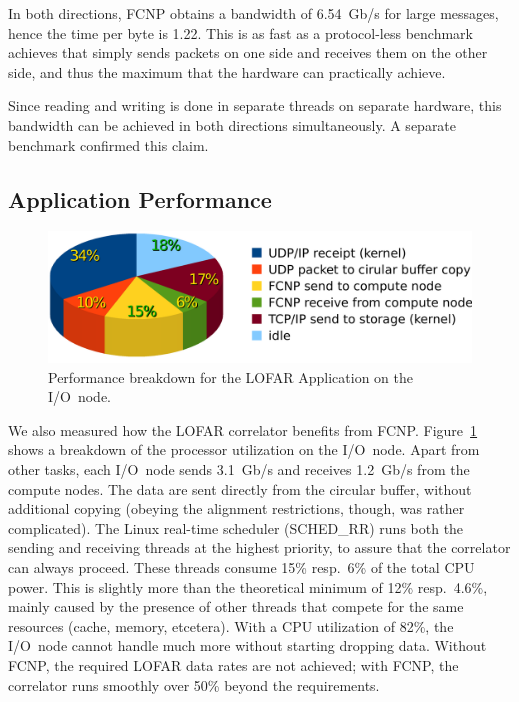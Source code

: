 \documentclass[journal]{IEEEtran}
\begin{document}
In both directions, FCNP obtains a bandwidth of 6.54~Gb/s for large messages,
hence the time per byte is 1.22\ns.
This is as fast as a protocol-less benchmark achieves that simply sends packets
on one side and receives them on the other side, and thus the maximum that
the hardware can practically achieve.

Since reading and writing is done in separate threads on separate hardware,
this bandwidth can be achieved in both directions simultaneously.
A separate benchmark confirmed this claim.




\subsection{Application Performance}

\begin{figure}[h]
\includegraphics[width=\columnwidth]{ionode-load.pdf}
\caption{Performance breakdown for the LOFAR Application on the I/O~node.}
\label{fig:ionode-load}
\end{figure}

We also measured how the LOFAR correlator benefits from FCNP.
Figure~\ref{fig:ionode-load} shows a breakdown of the processor
utilization on the I/O~node.
Apart from other tasks, each I/O~node sends 3.1~Gb/s and receives 1.2~Gb/s
from the compute nodes.
The data are sent directly from the circular buffer, without additional
copying (obeying the alignment restrictions, though, was rather complicated).
The Linux real-time scheduler (SCHED\_RR) runs both the sending and receiving
threads at the highest priority, to assure that the correlator can always
proceed.
These threads consume 15\% resp.\ 6\% of the total CPU power.
This is slightly more than the theoretical minimum of 12\% resp.\ 4.6\%,
mainly caused by the presence of other threads that compete for the same
resources (cache, memory, etcetera).
With a CPU utilization of 82\%, the I/O~node cannot handle much more without
starting dropping data.
Without FCNP, the required LOFAR data rates are not achieved;
with FCNP, the correlator runs smoothly over 50\% beyond the requirements.
\end{document}
